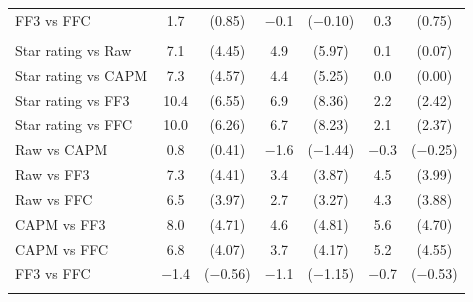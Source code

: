 \begin{tabular}{lcccccc}
FF3 vs FFC & 1.7 & (0.85) & $-$0.1 & ($-$0.10) & 0.3 & (0.75) \\
\addlinespace
\multicolumn{7}{l}{\textit{Probability of a positive flow, percentage points}} \\
Star rating vs Raw & 7.1 & (4.45) & 4.9 & (5.97) & 0.1 & (0.07) \\
Star rating vs CAPM & 7.3 & (4.57) & 4.4 & (5.25) & 0.0 & (0.00) \\
Star rating vs FF3 & 10.4 & (6.55) & 6.9 & (8.36) & 2.2 & (2.42) \\
Star rating vs FFC & 10.0 & (6.26) & 6.7 & (8.23) & 2.1 & (2.37) \\
Raw vs CAPM & 0.8 & (0.41) & $-$1.6 & ($-$1.44) & $-$0.3 & ($-$0.25) \\
Raw vs FF3 & 7.3 & (4.41) & 3.4 & (3.87) & 4.5 & (3.99) \\
Raw vs FFC & 6.5 & (3.97) & 2.7 & (3.27) & 4.3 & (3.88) \\
CAPM vs FF3 & 8.0 & (4.71) & 4.6 & (4.81) & 5.6 & (4.70) \\
CAPM vs FFC & 6.8 & (4.07) & 3.7 & (4.17) & 5.2 & (4.55) \\
FF3 vs FFC & $-$1.4 & ($-$0.56) & $-$1.1 & ($-$1.15) & $-$0.7 & ($-$0.53) \\
\addlinespace
\bottomrule
\end{tabular}
